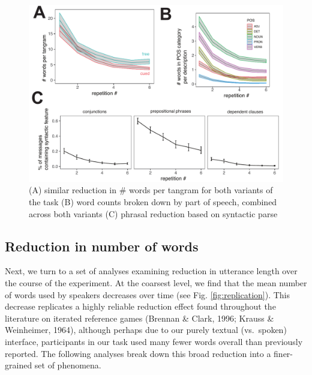 \documentclass[alpha-refs]{wiley-article}
\begin{document}
\begin{figure}[t]
\includegraphics[scale=.65]{reduction.pdf}
\caption{(A) similar reduction in \# words per tangram for both variants of the task (B) word counts broken down by part of speech, combined across both variants (C) phrasal reduction based on syntactic parse }
\label{fig:reduction}
\end{figure}

\subsection{Reduction in number of words}\label{reduction}

Next, we turn to a set of analyses examining reduction in utterance
length over the course of the experiment. At the coarsest level, we find
that the mean number of words used by speakers decreases over time (see
Fig. \ref{fig:replication}). This decrease replicates a highly reliable
reduction effect found throughout the literature on iterated reference
games (Brennan \& Clark, 1996; Krauss \& Weinheimer, 1964), although
perhaps due to our purely textual (vs.~spoken) interface, participants
in our task used many fewer words overall than previously reported. The
following analyses break down this broad reduction into a finer-grained
set of phenomena.
\end{document}
